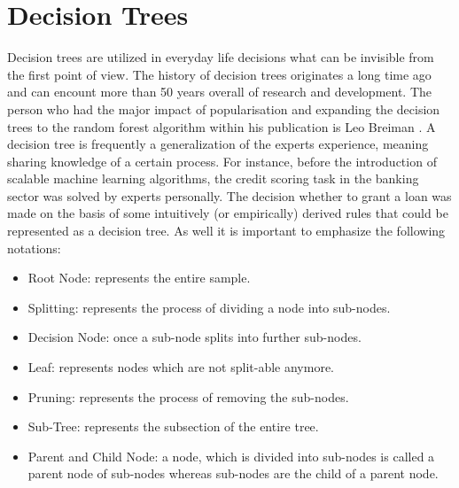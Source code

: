 \documentclass{article}
\begin{document}
\section{Decision Trees}
Decision trees are utilized in everyday life decisions what can be invisible from the first point of view. The history of decision trees originates a long time ago and can encount more than 50 years overall of research and development.  
The person who had the major impact of popularisation and expanding the decision trees to the random forest algorithm within his publication is Leo Breiman \cite{Breiman2001}. A decision tree is frequently a generalization of the experts experience, meaning sharing knowledge of a certain process. For instance, before the introduction of scalable machine learning algorithms, the credit scoring task in the banking sector was solved by experts personally. The decision whether to grant a loan was made on the basis of some intuitively (or empirically) derived rules that could be represented as a decision tree. As well it is important to emphasize the following notations:
\begin{itemize}
    \item Root Node: represents the entire sample. 
    \item Splitting: represents the process of dividing a node into sub-nodes. 
    \item Decision Node: once a sub-node splits into further sub-nodes.
    \item Leaf: represents nodes which are not split-able anymore.  
    \item Pruning: represents the process of removing the sub-nodes.
    \item Sub-Tree: represents the subsection of the entire tree.
    \item Parent and Child Node: a node, which is divided into sub-nodes is called a parent node of sub-nodes whereas sub-nodes are the child of a parent node.
\end{itemize}
\end{document}
